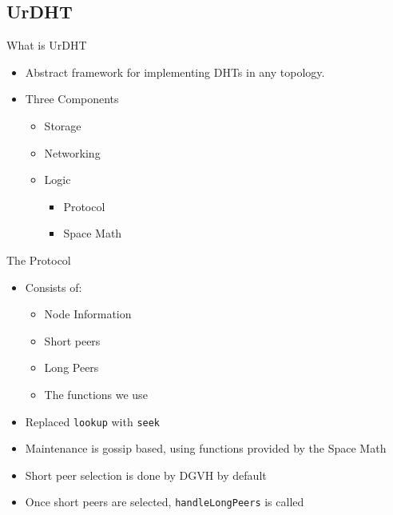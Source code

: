 \documentclass[11pt]{beamer}
\begin{document}
\subsection{UrDHT}

\begin{frame}{What is UrDHT}
	\begin{itemize}
		\item Abstract framework for implementing DHTs in any topology.
		\item Three Components
		\begin{itemize}
			\item Storage 
			\item Networking
			\item Logic
			\begin{itemize}
				\item Protocol
				\item Space Math
			\end{itemize}
		\end{itemize}
	\end{itemize}
\end{frame}



\begin{frame}{The Protocol}

	\begin{itemize}
		\item Consists of:
		\begin{itemize}
			\item Node Information
			\item Short peers
			\item Long Peers
			\item The functions we use
		\end{itemize}
		\item Replaced \texttt{lookup} with \texttt{seek}
		\item Maintenance is gossip based, using functions provided by the Space Math
		\item Short peer selection is done by DGVH by default
		\item Once short peers are selected, \texttt{handleLongPeers} is called
	\end{itemize}
\end{frame}
\end{document}
